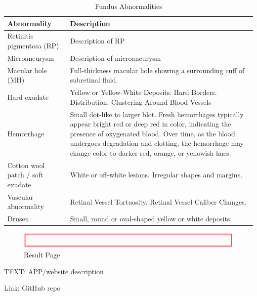 \documentclass{article}
\begin{document}
	{
		\fontsize{9}{12}\selectfont
		{
			\begin{longtable}{lp{3.8in}}
				\caption{Fundus Abnormalities}
				\label{tb:fundus-ab}\\
				\toprule
				Abnormality&Description\\
				\toprule
				
				\multicolumn{1}{l}{Retinitis pigmentosa (RP)}
				& Description of RP\\
				
				\multicolumn{1}{l}{Microaneurysm}
				& Description of microaneurysm\\
				
				\multicolumn{1}{l}{Macular hole (MH)} & Full-thickness macular hole showing a surrounding cuff of subretinal fluid.\\
				
				\multicolumn{1}{l}{Hard exudate} & Yellow or Yellow-White Deposits.  Hard Borders.  Distribution.  Clustering Around Blood Vessels\\
				
				\multicolumn{1}{l}{Hemorrhage} & Small dot-like to larger blot.  Fresh hemorrhages typically appear bright red or deep red in color, indicating the presence of oxygenated blood. Over time, as the blood undergoes degradation and clotting, the hemorrhage may change color to darker red, orange, or yellowish hues.\\
				
				\multicolumn{1}{l}{Cotton wool patch / soft exudate} & White or off-white lesions.  Irregular shapes and margins.\\
				
				\multicolumn{1}{l}{Vascular abnormality} & Retinal Vessel Tortuosity.  Retinal Vessel Caliber Changes.  \\
				
				\multicolumn{1}{l}{Drusen} & Small, round or oval-shaped yellow or white deposits.\\
				
				\bottomrule
			\end{longtable}
		}
	}
	
	
	\begin{figure}[htbp]
		\centering
		\includegraphics[width=\linewidth]{Figs/Temp.png}
		\caption{Result Page}
		\vspace{0.3cm}
		\label{fig:result_page}
	\end{figure}
	
	TEXT: APP/website description
	
	Link: GitHub repo
	
\end{document}

